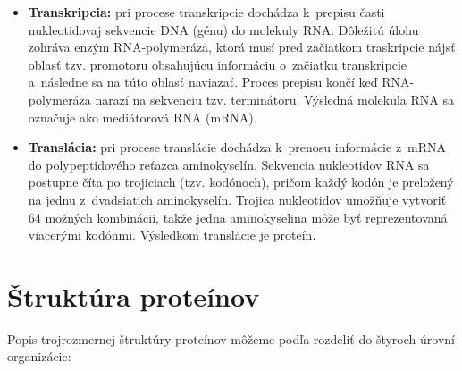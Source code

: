 \begin{itemize}

\item \textbf{Transkripcia:} pri procese transkripcie dochádza k~prepisu časti nukleotidovaj sekvencie DNA (génu) do molekuly RNA. Dôležitú úlohu zohráva enzým RNA-polymeráza, ktorá musí pred začiatkom traskripcie nájsť oblasť tzv. promotoru obsahujúcu informáciu o~začiatku transkripcie a~následne sa na túto oblasť naviazať. Proces prepisu končí keď RNA-polymeráza narazí na sekvenciu tzv. terminátoru. Výsledná molekula RNA sa označuje ako mediátorová RNA (mRNA). 
\item \textbf{Translácia:} pri procese translácie dochádza k~prenosu informácie z~mRNA do polypeptidového reťazca aminokyselín. Sekvencia nukleotidov RNA sa postupne číta po trojiciach (tzv. kodónoch), pričom každý kodón je preložený na jednu z~dvadsiatich aminokyselín. Trojica nukleotidov umožňuje vytvoriť 64 možných kombinácií, takže jedna aminokyselina môže byť reprezentovaná viacerými kodónmi. Výsledkom translácie je proteín.

\end{itemize}
\newpage
\section{Štruktúra proteínov}
Popis trojrozmernej štruktúry proteínov môžeme podľa \cite{aminokyseliny} rozdeliť do štyroch úrovní organizácie:


